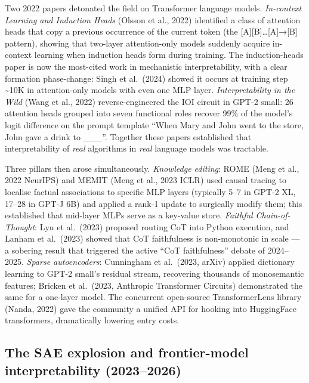 Two 2022 papers detonated the field on Transformer language models. \emph{In-context Learning and Induction Heads} (Olsson et al., 2022) identified a class of attention heads that copy a previous occurrence of the current token (the {[}A{]}{[}B{]}\ldots{[}A{]}→{[}B{]} pattern), showing that two-layer attention-only models suddenly acquire in-context learning when induction heads form during training. The induction-heads paper is now the most-cited work in mechanistic interpretability, with a clear formation phase-change: Singh et al.~(2024) showed it occurs at training step \textasciitilde10K in attention-only models with even one MLP layer. \emph{Interpretability in the Wild} (Wang et al., 2022) reverse-engineered the IOI circuit in GPT-2 small: 26 attention heads grouped into seven functional roles recover 99\% of the model's logit difference on the prompt template ``When Mary and John went to the store, John gave a drink to \_\_\_''. Together these papers established that interpretability of \emph{real} algorithms in \emph{real} language models was tractable.

Three pillars then arose simultaneously. \emph{Knowledge editing}: ROME (Meng et al., 2022 NeurIPS) and MEMIT (Meng et al., 2023 ICLR) used causal tracing to localise factual associations to specific MLP layers (typically 5--7 in GPT-2 XL, 17--28 in GPT-J 6B) and applied a rank-1 update to surgically modify them; this established that mid-layer MLPs serve as a key-value store. \emph{Faithful Chain-of-Thought}: Lyu et al.~(2023) proposed routing CoT into Python execution, and Lanham et al.~(2023) showed that CoT faithfulness is non-monotonic in scale --- a sobering result that triggered the active ``CoT faithfulness'' debate of 2024--2025. \emph{Sparse autoencoders}: Cunningham et al.~(2023, arXiv) applied dictionary learning to GPT-2 small's residual stream, recovering thousands of monosemantic features; Bricken et al.~(2023, Anthropic Transformer Circuits) demonstrated the same for a one-layer model. The concurrent open-source TransformerLens library (Nanda, 2022) gave the community a unified API for hooking into HuggingFace transformers, dramatically lowering entry costs.

\subsection{The SAE explosion and frontier-model interpretability (2023--2026)}\label{the-sae-explosion-and-frontier-model-interpretability-20232026}

